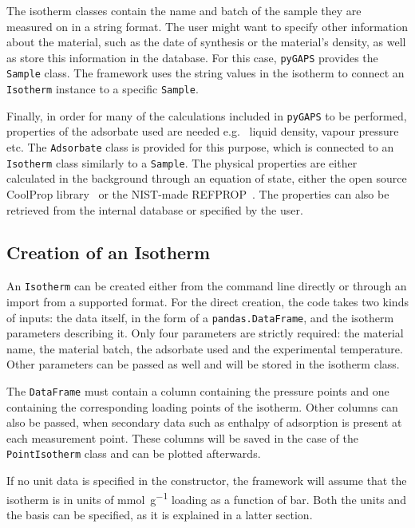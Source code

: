 The isotherm classes contain the name and batch of the sample they are measured on
in a string format. The user might want to specify other information about the material,
such as the date of synthesis or the material's density,
as well as store this information in the database.
For this case, \texttt{pyGAPS} provides the \texttt{Sample} class.
The framework uses the string values
in the isotherm to connect an \texttt{Isotherm} instance to a specific \texttt{Sample}.

Finally, in order for many of the calculations included in \texttt{pyGAPS} to be performed,
properties of the adsorbate used are needed e.g. \ liquid density, vapour pressure etc.
The \texttt{Adsorbate} class is provided for this purpose,
which is connected to an \texttt{Isotherm} class similarly to a \texttt{Sample}. The physical
properties are either calculated in the background through an equation of state,
either the open source CoolProp library~\cite{bellPurePseudopureFluid2014} or
the NIST-made REFPROP~\cite{lemmonNISTReferenceFluid1989}.
The properties can also be retrieved from the internal database or specified by the user.

\subsection{Creation of an Isotherm}

An \texttt{Isotherm} can be created either from the command line directly or through an import
from a supported format. For the direct creation, the code takes
two kinds of inputs: the data itself, in the form of a \texttt{pandas.DataFrame}, and the
isotherm parameters describing it. Only four parameters are strictly required:
the material name, the material batch, the adsorbate used and the experimental temperature.
Other parameters can be passed as well and will be stored in the isotherm class.

The \texttt{DataFrame} must contain a column containing the pressure points and one containing
the corresponding loading points of the isotherm. Other columns can also be passed, when
secondary data such as enthalpy of adsorption is present at each measurement point.
These columns will be saved in the case of the \texttt{PointIsotherm} class and can be
plotted afterwards.

If no unit data is specified in the constructor, the framework will assume that the
isotherm is in units of \si{\milli\mole\per\gram} loading as a function of \si{\bar}.
Both the units and the basis can be specified, as it is explained in a latter section.

